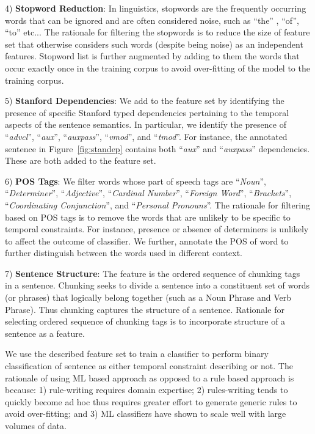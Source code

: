 4) \textbf{Stopword Reduction}: In linguistics, stopwords are the frequently occurring words that can be ignored and are often considered noise, such as ``the'' , ``of'', ``to'' etc... The rationale for filtering the stopwords is to reduce the size of feature set that otherwise considers such words (despite being noise) as an independent features. Stopword list is further augmented by adding to them the words that occur exactly once in the training corpus to avoid over-fitting of the model to the training corpus.  
	
5) \textbf{Stanford Dependencies}: We add to the feature set by identifying the presence of specific Stanford typed dependencies pertaining to the temporal aspects of the sentence semantics. In particular, we identify the presence of ``\textit{advcl}'', ``\textit{aux}'', ``\textit{auxpass}'', ``\textit{vmod}'', and ``\textit{tmod}''. For instance, the annotated sentence in Figure~\ref{fig:standep} contains both ``\textit{aux}'' and ``\textit{auxpass}'' dependencies. These are both added to the feature set.
	
6) \textbf{POS Tags}: We filter words whose part of speech tags are ``\textit{Noun}'', ``\textit{Determiner}'', ``\textit{Adjective}'', ``\textit{Cardinal Number}'', ``\textit{Foreign Word}'', ``\textit{Brackets}'', ``\textit{Coordinating Conjunction}'', and ``\textit{Personal Pronouns}''. The rationale for filtering based on POS tags is to remove the words that are unlikely to be specific to temporal constraints. For instance, presence or absence of determiners is unlikely to affect the outcome of classifier. We further, annotate the POS of word to further distinguish between the words used in different context.
	
7) \textbf{Sentence Structure}: The feature is the ordered sequence of chunking tags~\cite{Klein03,KleinNIPS03} in a sentence. Chunking seeks to divide a sentence into a constituent set of words (or phrases) that logically belong together (such as a Noun Phrase and Verb Phrase). Thus chunking captures the structure of a sentence. Rationale for selecting ordered sequence of chunking tags is to incorporate structure of a sentence as a feature.        
    

We use the described feature set to train a classifier to perform binary classification of sentence as either temporal constraint describing or not. The rationale of using ML based approach as opposed to a rule based approach is because: 1) rule-writing requires domain expertise; 2) rules-writing tends to quickly become ad hoc thus requires greater effort to generate generic rules to avoid over-fitting; and 3) ML classifiers have shown to scale well with large volumes of data.

